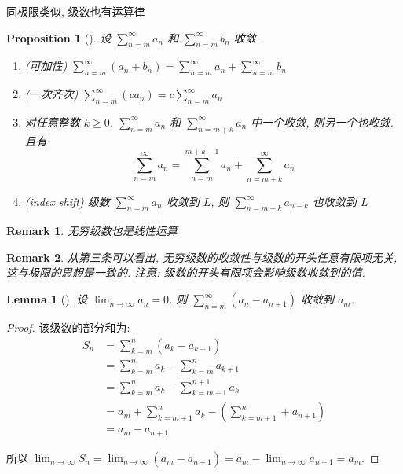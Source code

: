 \documentclass[UTF8]{ctexart}
\theoremstyle{mystyle}
\newtheorem{lemma}{Lemma}[section]
\newtheorem{proposition}{Proposition}[section]
\theoremstyle{myremark}
\newtheorem*{remark}{Remark}
\theoremstyle{plain}
\begin{document}
同极限类似, 级数也有运算律
\begin{proposition}[] 
    设 $ \displaystyle \sum_{n = m}^\infty a_n $ 和 $ \sum_{n = m}^\infty b_n $ 收敛.
    \begin{enumerate}
        \item (可加性) $ \displaystyle \sum_{n = m}^{\infty} (a_n + b_n) = \sum_{n = m}^{\infty} a_n + \sum_{n =m }^{\infty} b_n $
        \item (一次齐次) $ \displaystyle \sum_{n = m}^{\infty} (c a_n) = c\sum_{n = m}^{\infty} a_n $
        \item 对任意整数 $ k \geqslant 0 $. $ \displaystyle \sum_{n = m}^{\infty} a_n $ 和 $ \displaystyle \sum_{n = m + k}^{\infty} a_n $ 中一个收敛, 则另一个也收敛. 且有: \[ \sum_{n = m}^{\infty} a_n = \sum_{n = m}^{m + k - 1} a_n + \sum_{n = m + k}^{\infty} a_n \]
        \item (index shift) 级数 $ \displaystyle \sum_{n = m}^{\infty} a_n $ 收敛到 $ L $, 则 $ \displaystyle \sum_{n = m + k}^{\infty} a_{n - k} $ 也收敛到 $ L $
    \end{enumerate}
\end{proposition}

\begin{remark}
    无穷级数也是线性运算
\end{remark}

\begin{remark}
    从第三条可以看出, 无穷级数的收敛性与级数的开头任意有限项无关, 这与极限的思想是一致的. 注意: 级数的开头有限项会影响级数收敛到的值.
\end{remark}

\begin{lemma}[]
    设 $ \displaystyle \lim_{n \to \infty} a_n = 0 $. 则 $ \displaystyle \sum_{n = m}^{\infty} (a_n - a_{n + 1}) $ 收敛到 $ a_m $.
\end{lemma}

\begin{proof}
    该级数的部分和为:
    \begin{align*}
        S_n &= \sum_{k = m}^{n} (a_k - a_{k + 1}) \\
        &= \sum_{k = m}^{n} a_k - \sum_{k = m}^{n} a_{k + 1} \\
        &= \sum_{k = m}^{n} a_k - \sum_{k = m + 1}^{n + 1} a_{k} \\
        &= a_m + \sum_{k = m + 1}^{n} a_k - \left( \sum_{k = m + 1}^{n} + a_{n + 1} \right) \\
        &= a_m - a_{n + 1}
    \end{align*}

    所以 $ \displaystyle \lim_{n \to \infty} S_n = \lim_{n \to \infty} (a_m - a_{n + 1}) = a_m - \lim_{n \to \infty} a_{n + 1} = a_m $.
\end{proof}
\end{document}
